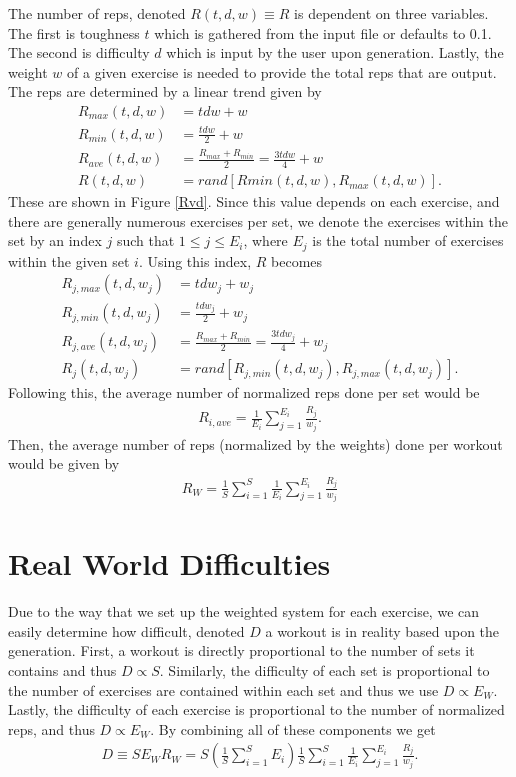 The number of reps, denoted $R(t,d,w) \equiv R$ is dependent on three variables. The first is toughness $t$ which is gathered from the input file or defaults to 0.1. The second is difficulty $d$ which is input by the user upon generation. Lastly, the weight $w$ of a given exercise is needed to provide the total reps that are output. The reps are determined by a linear trend given by
\begin{align}
	R_{max}(t,d,w) &= tdw+w \\
	R_{min}(t,d,w) &= \frac{tdw}{2}+w \\
	R_{ave}(t,d,w) &= \frac{R_{max}+R_{min}}{2} = \frac{3tdw}{4}+w \\
	R(t,d,w) &= rand[R{min}(t,d,w),R_{max}(t,d,w)].
\end{align}
These are shown in Figure \ref{Rvd}. Since this value depends on each exercise, and there are generally numerous exercises per set, we denote the exercises within the set by an index $j$ such that $1 \leq j \leq E_i$, where $E_j$ is the total number of exercises within the given set $i$. Using this index, $R$ becomes
\begin{align}
	R_{j,max}(t,d,w_j) &= tdw_j+w_j \\
	R_{j,min}(t,d,w_j) &= \frac{tdw_j}{2}+w_j \\
	R_{j,ave}(t,d,w_j) &= \frac{R_{max}+R_{min}}{2} = \frac{3tdw_j}{4}+w_j \\
	R_j(t,d,w_j) &= rand[R_{j,min}(t,d,w_j),R_{j,max}(t,d,w_j)].
\end{align}
Following this, the average number of normalized reps done per set would be
\begin{align}
	R_{i,ave} = \frac{1}{E_i}\sum_{j=1}^{E_i}\frac{R_j}{w_j}.
\end{align}
Then, the average number of reps (normalized by the weights) done per workout would be given by
\begin{align}
	R_{W} = \frac{1}{S}\sum_{i=1}^{S}\frac{1}{E_i}\sum_{j=1}^{E_i}\frac{R_j}{w_j}
\end{align}

\section{Real World Difficulties} 

Due to the way that we set up the weighted system for each exercise, we can easily determine how difficult, denoted $D$ a workout is in reality based upon the generation. First, a workout is directly proportional to the number of sets it contains and thus $D \propto S$. Similarly, the difficulty of each set is proportional to the number of exercises are contained within each set and thus we use $D \propto E_{W}$. Lastly, the difficulty of each exercise is proportional to the number of normalized reps, and thus $D \propto E_{W}$. By combining all of these components we get
\begin{align}
	D \equiv S E_{W} R_{W} = S \left(\frac{1}{S}\sum_{i=1}^{S}E_i \right)\frac{1}{S}\sum_{i=1}^{S}\frac{1}{E_i}\sum_{j=1}^{E_i}\frac{R_j}{w_j}.
\end{align}

	

